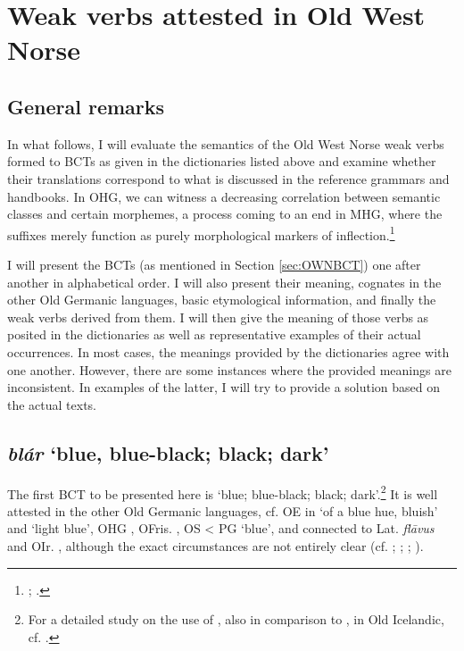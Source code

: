 \documentclass[output=paper,colorlinks,citecolor=brown]{langscibook}
\begin{document}
\section{Weak verbs attested in Old West Norse}
\label{sec:OWNdata}
\subsection{General remarks}
\label{sec:OWNgeneral}

In what follows, I will evaluate the semantics of the Old West Norse weak verbs formed to BCTs  as given in the dictionaries listed above and examine whether their translations correspond to what is discussed in the reference grammars and handbooks. In OHG, we can witness a decreasing correlation between semantic classes and certain morphemes, a process coming to an end in MHG, where the suffixes merely function as purely morphological markers of inflection.\footnote{; \citet[109--111]{Boldt2023}.}

I will present the BCTs  (as mentioned in Section \ref{sec:OWNBCT}) one after another in alphabetical order. I will also present their meaning, cognates in the other Old Germanic languages, basic etymological information, and finally the weak verbs derived from them. I will then give the meaning of those verbs as posited in the dictionaries as well as representative examples of their actual occurrences. In most cases, the meanings provided by the dictionaries agree with one another.  However, there are some instances where the provided meanings are inconsistent. In examples of the latter, I will try to provide a solution based on the actual texts.

\subsection{\textit{blár} ‘blue, blue-black; black; dark’}
\label{sec:OWNblue}

The first BCT  to be presented here is  ‘blue; blue-black; black; dark’.\footnote{For a detailed study on the use of , also in comparison to , in Old Icelandic, cf. \citet{Wolf2006b}.} It is well attested in the other Old Germanic languages, cf. OE in  ‘of a blue hue, bluish’ and  ‘light blue’, OHG , OFris. , OS  < PG  ‘blue’, and connected to Lat. \textit{flāvus} and OIr. , although the exact circumstances are not entirely clear (cf. ; ; ; \citealt[63]{Luhr2000}).
\end{document}

